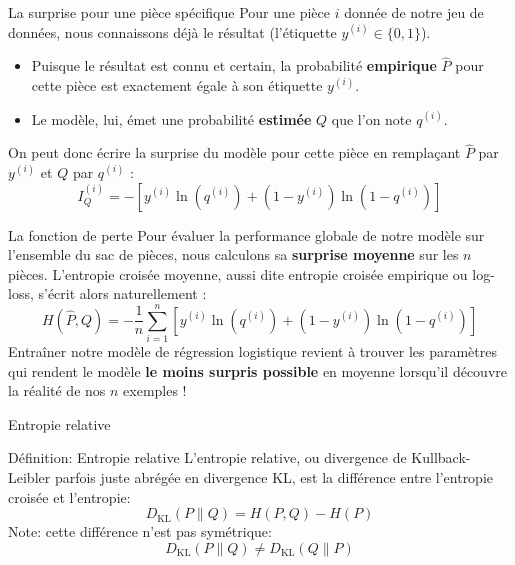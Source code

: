 \begin{frame}{La surprise pour une pièce spécifique}
	Pour une pièce $i$ donnée de notre jeu de données, nous connaissons déjà le résultat (l'étiquette $y^{(i)} \in \{0, 1\}$).
	\pause
	\begin{itemize}
		\item Puisque le résultat est connu et certain, la probabilité \textbf{empirique} $\hat{P}$ pour cette pièce est exactement égale à son étiquette $y^{(i)}$.
		\item Le modèle, lui, émet une probabilité \textbf{estimée} $Q$ que l'on note $q^{(i)}$.
	\end{itemize}
	\pause
	\vspace{0.3cm}
	On peut donc écrire la surprise du modèle pour cette pièce en remplaçant $\hat{P}$ par $y^{(i)}$ et $Q$ par $q^{(i)}$ :
	\begin{equation*}
		I_Q^{(i)} = - \left[ y^{(i)} \ln(q^{(i)}) + (1 - y^{(i)}) \ln(1 - q^{(i)}) \right]
	\end{equation*}
\end{frame}

\begin{frame}{La fonction de perte}
	Pour évaluer la performance globale de notre modèle sur l'ensemble du sac de pièces, nous calculons sa \textbf{surprise moyenne} sur les $n$ pièces.
	\pause
	L'entropie croisée moyenne, aussi dite entropie croisée empirique ou log-loss, s'écrit alors naturellement :
	\begin{equation*}
		H(\hat{P}, Q) 
		= - \frac{1}{n} \sum_{i=1}^n \left[ y^{(i)} \ln{\left(q^{(i)}\right)} + (1 - y^{(i)}) \ln{\left(1 - q^{(i)}\right)} \right]
	\end{equation*}
	\pause
	Entraîner notre modèle de régression logistique revient à trouver les paramètres qui rendent le modèle \textbf{le moins surpris possible} en moyenne lorsqu'il découvre la réalité de nos $n$ exemples !
\end{frame}

\begin{frame}{Entropie relative}
	\begin{block}{Définition: Entropie relative}
		L'entropie relative, ou divergence de Kullback-Leibler parfois juste abrégée en divergence KL, est la différence entre l'entropie croisée et l'entropie:
		\begin{equation*}
			D_{\text{KL}}(P \parallel Q) = H(P,Q) - H(P)
		\end{equation*}
		Note: cette différence n'est pas symétrique:
		\begin{equation*}
			D_{\text{KL}}(P \parallel Q) \ne D_{\text{KL}}(Q \parallel P)
		\end{equation*}
	\end{block}
\end{frame}

